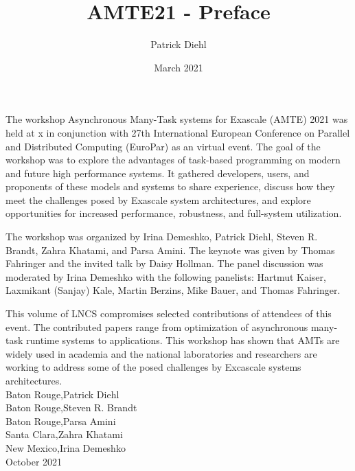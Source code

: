 \documentclass{article}
\title{AMTE21 - Preface}
\author{Patrick Diehl}
\date{March 2021}
\begin{document}
\noindent The workshop Asynchronous Many-Task systems for Exascale (AMTE) 2021 was held at x in conjunction with 27th International European Conference on Parallel and Distributed Computing (EuroPar) as an virtual event. The goal of the workshop was to explore the advantages of task-based programming on modern and future high performance systems. It gathered developers, users, and proponents of these models and systems to share experience, discuss how they meet the challenges posed by Exascale system architectures, and explore opportunities for increased performance, robustness, and full-system utilization.

The workshop was organized by Irina Demeshko, Patrick Diehl, Steven R. Brandt, Zahra Khatami, and Parsa Amini. The keynote was given by Thomas Fahringer and the invited talk by Daisy Hollman. The panel discussion was moderated by Irina Demeshko with the following panelists: Hartmut Kaiser, Laxmikant (Sanjay) Kale, Martin Berzins, Mike Bauer, and Thomas Fahringer.

This volume of LNCS compromises selected contributions of attendees of this event. The contributed papers range from optimization of asynchronous many-task runtime systems to applications. This workshop has shown that AMTs are widely used in academia and the national laboratories and researchers are working to address some of the posed challenges by Excascale systems architectures.\\

\noindent
Baton Rouge,\hfill Patrick Diehl\\
Baton Rouge,\hfill Steven R. Brandt\\
Baton Rouge,\hfill Parsa Amini\\
Santa Clara,\hfill Zahra Khatami\\
New Mexico,\hfill Irina Demeshko\\
October 2021
\end{document}
